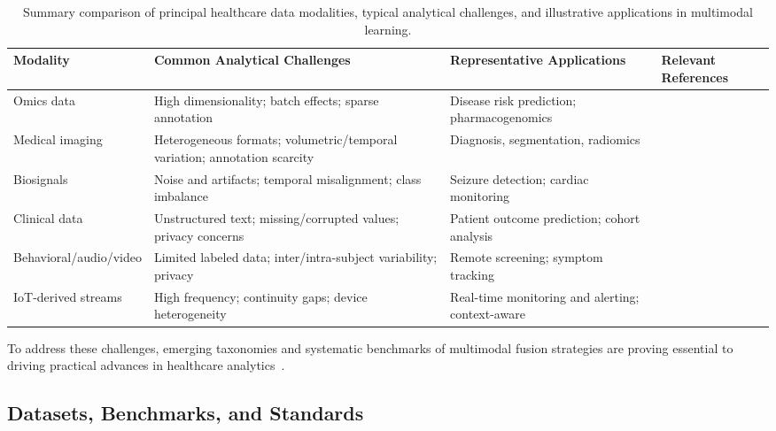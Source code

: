 \documentclass[sigconf]{acmart}
\begin{document}
\begin{table*}[htbp]
\centering
\caption{Summary comparison of principal healthcare data modalities, typical analytical challenges, and illustrative applications in multimodal learning.}
\label{tab:modality_comparison}
\begin{adjustbox}{max width=\textwidth}
\begin{tabular}{@{}llll@{}}
\toprule
\textbf{Modality}        & \textbf{Common Analytical Challenges}                                      & \textbf{Representative Applications}              & \textbf{Relevant References}          \\
\midrule
Omics data               & High dimensionality; batch effects; sparse annotation                      & Disease risk prediction; pharmacogenomics         & \cite{ref61,ref90}                    \\
Medical imaging          & Heterogeneous formats; volumetric/temporal variation; annotation scarcity  & Diagnosis, segmentation, radiomics                & \cite{ref46,ref50,ref54,ref55,ref62}  \\
Biosignals               & Noise and artifacts; temporal misalignment; class imbalance                & Seizure detection; cardiac monitoring             & \cite{ref68,ref89,ref107}             \\
Clinical data            & Unstructured text; missing/corrupted values; privacy concerns              & Patient outcome prediction; cohort analysis       & \cite{ref82,ref83,ref84,ref90,ref106} \\
Behavioral/audio/video   & Limited labeled data; inter/intra-subject variability; privacy             & Remote screening; symptom tracking                & \cite{ref25,ref35,ref89,ref90}        \\
IoT-derived streams      & High frequency; continuity gaps; device heterogeneity                      & Real-time monitoring and alerting; context-aware  & \cite{ref90,ref106,ref107}            \\
\bottomrule
\end{tabular}
\end{adjustbox}
\end{table*}

To address these challenges, emerging taxonomies and systematic benchmarks of multimodal fusion strategies are proving essential to driving practical advances in healthcare analytics~\cite{ref18,ref90,ref107}.

\subsection{Datasets, Benchmarks, and Standards}
\end{document}
